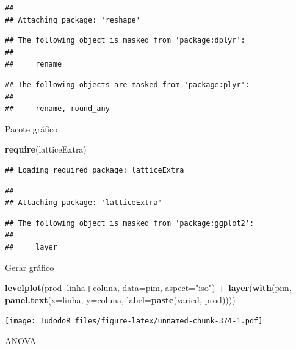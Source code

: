 \documentclass[
]{book}
\newenvironment{Shaded}{\begin{snugshade}}{\end{snugshade}}
\newcommand{\DataTypeTok}[1]{\textcolor[rgb]{0.13,0.29,0.53}{#1}}
\newcommand{\KeywordTok}[1]{\textcolor[rgb]{0.13,0.29,0.53}{\textbf{#1}}}
\newcommand{\NormalTok}[1]{#1}
\newcommand{\OperatorTok}[1]{\textcolor[rgb]{0.81,0.36,0.00}{\textbf{#1}}}
\newcommand{\StringTok}[1]{\textcolor[rgb]{0.31,0.60,0.02}{#1}}
\begin{document}
\begin{verbatim}
## 
## Attaching package: 'reshape'
\end{verbatim}

\begin{verbatim}
## The following object is masked from 'package:dplyr':
## 
##     rename
\end{verbatim}

\begin{verbatim}
## The following objects are masked from 'package:plyr':
## 
##     rename, round_any
\end{verbatim}

Pacote gráfico

\begin{Shaded}
\begin{Highlighting}[]
\KeywordTok{require}\NormalTok{(latticeExtra)}
\end{Highlighting}
\end{Shaded}

\begin{verbatim}
## Loading required package: latticeExtra
\end{verbatim}

\begin{verbatim}
## 
## Attaching package: 'latticeExtra'
\end{verbatim}

\begin{verbatim}
## The following object is masked from 'package:ggplot2':
## 
##     layer
\end{verbatim}

Gerar gráfico

\begin{Shaded}
\begin{Highlighting}[]
\KeywordTok{levelplot}\NormalTok{(prod}\OperatorTok{~}\NormalTok{linha}\OperatorTok{+}\NormalTok{coluna, }\DataTypeTok{data=}\NormalTok{pim, }\DataTypeTok{aspect=}\StringTok{"iso"}\NormalTok{) }\OperatorTok{+}\StringTok{ }
\StringTok{  }\KeywordTok{layer}\NormalTok{(}\KeywordTok{with}\NormalTok{(pim, }\KeywordTok{panel.text}\NormalTok{(}\DataTypeTok{x=}\NormalTok{linha, }\DataTypeTok{y=}\NormalTok{coluna, }\DataTypeTok{label=}\KeywordTok{paste}\NormalTok{(varied, prod))))}
\end{Highlighting}
\end{Shaded}

\texttt{[image: TudodoR\_files/figure-latex/unnamed-chunk-374-1.pdf]}

ANOVA
\end{document}
